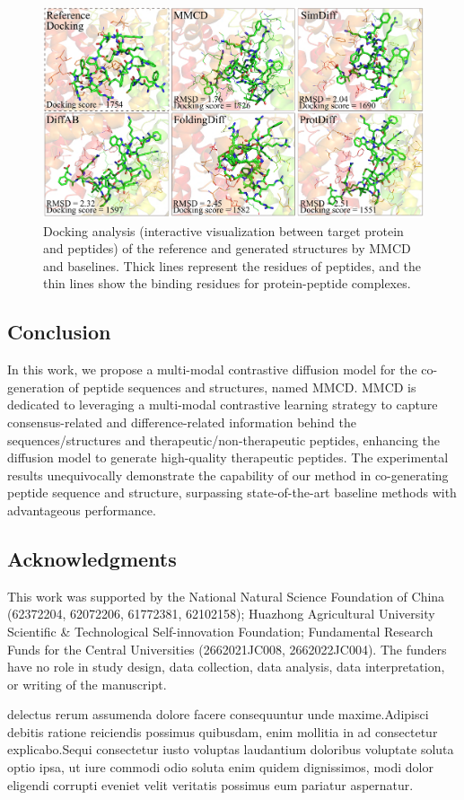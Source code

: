 \documentclass[letterpaper]{article} %
\begin{document}
\begin{figure}[ht]
\includegraphics[scale=0.135]{fig4.pdf}
\caption{Docking analysis (interactive visualization between target protein and peptides) of the reference and generated structures by MMCD and baselines. Thick lines represent the residues of peptides, and the thin lines show the binding residues for protein-peptide complexes.}
\end{figure}

\subsection{Conclusion}
In this work, we propose a multi-modal contrastive diffusion model for the co-generation of peptide sequences and structures, named MMCD. MMCD is dedicated to leveraging a multi-modal contrastive learning strategy to capture consensus-related and difference-related information behind the sequences/structures and therapeutic/non-therapeutic peptides, enhancing the diffusion model to generate high-quality therapeutic peptides. The experimental results unequivocally demonstrate the capability of our method in co-generating peptide sequence and structure, surpassing state-of-the-art baseline methods with advantageous performance.

\subsection{Acknowledgments}
This work was supported by the National Natural Science Foundation of China (62372204, 62072206, 61772381, 62102158); Huazhong Agricultural University Scientific \& Technological Self-innovation Foundation; Fundamental Research Funds for the Central Universities (2662021JC008, 2662022JC004). The funders have no role in study design, data collection, data analysis, data interpretation, or writing of the manuscript.

 delectus rerum assumenda dolore facere consequuntur unde maxime.Adipisci debitis ratione reiciendis possimus quibusdam, enim mollitia in ad consectetur explicabo.Sequi consectetur iusto voluptas laudantium doloribus voluptate soluta optio ipsa, ut iure commodi odio soluta enim quidem dignissimos, modi dolor eligendi corrupti eveniet velit veritatis possimus eum pariatur aspernatur.\clearpage

\end{document}
